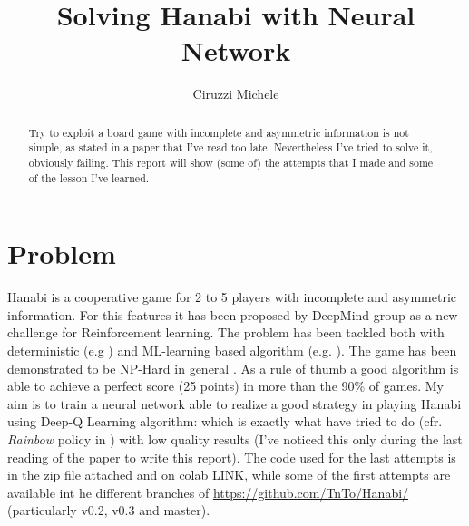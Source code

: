 \documentclass[]{article}
\title{Solving Hanabi with Neural Network}
\author{Ciruzzi Michele}
\begin{document}
\maketitle

\begin{abstract}
	Try to exploit a board game with incomplete and asymmetric information is not simple, as stated in a paper \cite{BARD2020103216} that I've read too late. Nevertheless I've tried to solve it, obviously failing. This report will show (some of) the attempts that I made and some of the lesson I've learned. 
\end{abstract}

\section{Problem}
Hanabi is a cooperative game for 2 to 5 players with incomplete and asymmetric information.
For this features it has been proposed by DeepMind group \parencite{BARD2020103216} as a new challenge for Reinforcement learning.
The problem has been tackled both with deterministic (e.g \cite{Cox2015}) and ML-learning based algorithm (e.g. \cite{Lerer2019}).
The game has been demonstrated to be NP-Hard in general \parencite{Baffier2016}.
As a rule of thumb a good algorithm is able to achieve a perfect score (25 points) in more than the 90\% of games.
My aim is to train a neural network able to realize a good strategy in playing Hanabi using Deep-Q Learning algorithm: which is exactly what \textcite{BARD2020103216} have tried to do (cfr. \textit{Rainbow} policy in \cite{BARD2020103216}) with low quality results (I've noticed this only during the last reading of the paper to write this report).
The code used for the last attempts is in the zip file attached and on colab LINK, while some of the first attempts are available int he different branches of \url{https://github.com/TnTo/Hanabi/} (particularly v0.2, v0.3 and master).

\end{document}
